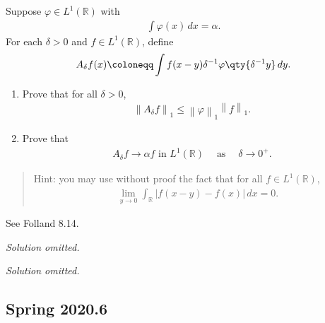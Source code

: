 \begin{problem}[?]

Suppose \(\varphi\in L^1({\mathbb{R}})\) with
\begin{align*}  
\int \varphi(x) \, dx = \alpha
.\end{align*}
For each \(\delta > 0\) and \(f\in L^1({\mathbb{R}})\), define
\begin{align*}  
A_\delta f(x) \coloneqq\int f(x-y) \delta^{-1} \varphi\qty{\delta^{-1} y}\, dy
.\end{align*}

\begin{enumerate}
\def\labelenumi{\alph{enumi}.}
\item
  Prove that for all \(\delta > 0\),
  \begin{align*}  
  {\left\lVert {A_\delta f} \right\rVert}_1 \leq {\left\lVert {\varphi} \right\rVert}_1 {\left\lVert {f} \right\rVert}_1
  .\end{align*}
\item
  Prove that
  \begin{align*}  
  A_\delta f \to \alpha f \text{ in } L^1({\mathbb{R}}) {\quad \operatorname{as} \quad} \delta\to 0^+
  .\end{align*}
\end{enumerate}

\begin{quote}
Hint: you may use without proof the fact that for all
\(f\in L^1({\mathbb{R}})\),
\begin{align*}  
\lim_{y\to 0} \int_{\mathbb{R}}{\left\lvert {f(x-y) - f(x)} \right\rvert}\, dx = 0
.\end{align*}
\end{quote}

\end{problem}

\begin{remark}

See Folland 8.14.

\end{remark}

\emph{Solution omitted.}

\emph{Solution omitted.}

\hypertarget{spring-2020.6}{%
\subsection{Spring 2020.6}\label{spring-2020.6}}

